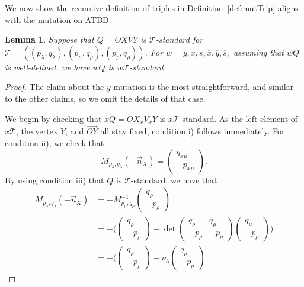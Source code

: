 \documentclass[11pt, reqno]{amsart}
\newtheorem{lemma}[thm]{Lemma}
\theoremstyle{remark}
\numberwithin{equation}{subsection}
\numberwithin{figure}{section}
\theoremstyle{customremark}
\newcommand{\Tt}{\mathcal{T}}
\newcommand{\ovr}{\overrightarrow}
\newcommand{\ov}{\overline}
\newcommand{\la}{{\lambda}}
\begin{document}
We now show the recursive definition of triples in Definition~\ref{def:mutTrip} aligns with the mutation on ATBD. 
\begin{lemma} \label{lem:standard}
Suppose that $Q=OXVY$ is $\Tt$-standard for $\Tt=((p_\la,q_\la),(p_\mu,q_\mu),(p_\rho,q_\rho))$. For $w=y,x,s,\ov{x},\ov{y},\ov{s},$ assuming that $wQ$ is well-defined, we have $wQ$ is $w\Tt$-standard.

\end{lemma}
\begin{proof}


The claim about the $y$-mutation is the most straightforward, and similar to the other claims, so we omit the details of that case. 



We begin by checking that $xQ = OX_xV_xY$ is $x\mathcal{T}$-standard. 
As the left element of $x\mathcal{T}$, the vertex $Y$, and $\ovr{OY}$ all stay fixed, condition i) follows 
immediately. For condition ii), we check that
\begin{equation} \label{eq:mixed} 
    M_{p_\lambda,q_\lambda}\left(-\vec{n}_X\right) = 
    \begin{pmatrix} q_{x\mu} \\ -p_{x\mu} \end{pmatrix}.
\end{equation}
By using condition iii) that $Q$ is $\mathcal{T}$-standard, we have that
\begin{align*} M_{p_\lambda,q_\lambda}\left(-\vec{n}_X\right) &= 
   -M_{p_\mu,q_\mu}^{-1}\begin{pmatrix} q_\rho \\ -p_\rho \end{pmatrix} \\
&=-\bigl(\begin{pmatrix} q_\rho \\ -p_\rho \end{pmatrix} 
   - \det\begin{pmatrix}
       q_\rho & q_\mu \\ -p_\rho & -p_\mu
   \end{pmatrix} \begin{pmatrix} q_\mu \\ -p_\mu \end{pmatrix}  \bigr) \\
&=-\bigl( \begin{pmatrix} q_\rho \\ -p_\rho \end{pmatrix} 
   - \nu_\lambda \begin{pmatrix} q_\mu \\ -p_\mu \end{pmatrix} 

\end{align*}
\end{proof}
\end{document}
